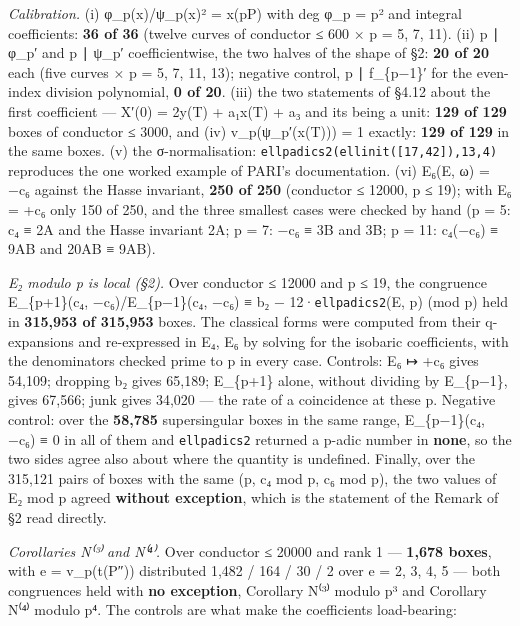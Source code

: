 \documentclass[11pt,a4paper]{article}
\theoremstyle{named}
\begin{document}
\textit{Calibration.} (i) φ\_p(x)/ψ\_p(x)² = x(pP) with deg φ\_p = p² and integral coefficients: \textbf{36 of 36} (twelve curves of conductor ≤ 600 × p = 5, 7, 11). (ii) p ∣ φ\_p′ and p ∣ ψ\_p′ coefficientwise, the two halves of the shape of §2: \textbf{20 of 20} each (five curves × p = 5, 7, 11, 13); negative control, p ∣ f\_\{p−1\}′ for the even-index division polynomial, \textbf{0 of 20}. (iii) the two statements of §4.12 about the first coefficient — X′(0) = 2y(T) + a₁x(T) + a₃ and its being a unit: \textbf{129 of 129} boxes of conductor ≤ 3000, and (iv) v\_p(ψ\_p′(x(T))) = 1 exactly: \textbf{129 of 129} in the same boxes. (v) the σ-normalisation: \texttt{ellpadics2(ellinit([17,42]),13,4)} reproduces the one worked example of PARI's documentation. (vi) E₆(E, ω) = −c₆ against the Hasse invariant, \textbf{250 of 250} (conductor ≤ 12000, p ≤ 19); with E₆ = +c₆ only 150 of 250, and the three smallest cases were checked by hand (p = 5: c₄ ≡ 2A and the Hasse invariant 2A; p = 7: −c₆ ≡ 3B and 3B; p = 11: c₄(−c₆) ≡ 9AB and 20AB ≡ 9AB).

\textit{E₂ modulo p is local (§2).} Over conductor ≤ 12000 and p ≤ 19, the congruence E\_\{p+1\}(c₄, −c₆)/E\_\{p−1\}(c₄, −c₆) ≡ b₂ − 12·\texttt{ellpadics2}(E, p) (mod p) held in \textbf{315,953 of 315,953} boxes. The classical forms were computed from their q-expansions and re-expressed in E₄, E₆ by solving for the isobaric coefficients, with the denominators checked prime to p in every case. Controls: E₆ ↦ +c₆ gives 54,109; dropping b₂ gives 65,189; E\_\{p+1\} alone, without dividing by E\_\{p−1\}, gives 67,566; junk gives 34,020 — the rate of a coincidence at these p. Negative control: over the \textbf{58,785} supersingular boxes in the same range, E\_\{p−1\}(c₄, −c₆) ≡ 0 in all of them and \texttt{ellpadics2} returned a p-adic number in \textbf{none}, so the two sides agree also about where the quantity is undefined. Finally, over the 315,121 pairs of boxes with the same (p, c₄ mod p, c₆ mod p), the two values of E₂ mod p agreed \textbf{without exception}, which is the statement of the Remark of §2 read directly.

\textit{Corollaries N⁽³⁾ and N⁽⁴⁾.} Over conductor ≤ 20000 and rank 1 — \textbf{1,678 boxes}, with e = v\_p(t(P″)) distributed 1,482 / 164 / 30 / 2 over e = 2, 3, 4, 5 — both congruences held with \textbf{no exception}, Corollary N⁽³⁾ modulo p³ and Corollary N⁽⁴⁾ modulo p⁴. The controls are what make the coefficients load-bearing:
\end{document}
